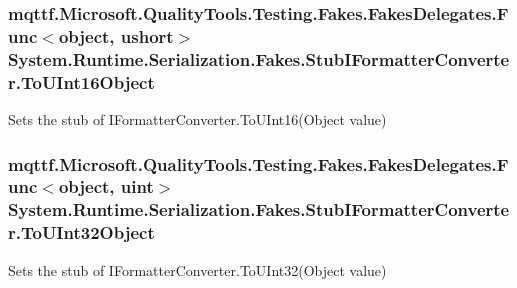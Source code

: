\hypertarget{class_system_1_1_runtime_1_1_serialization_1_1_fakes_1_1_stub_i_formatter_converter_a2c77ff194bd33699e51330b41dd48764}{
\subsubsection[{To\-U\-Int16\-Object}]{\setlength{\rightskip}{0pt plus 5cm}mqttf.\-Microsoft.\-Quality\-Tools.\-Testing.\-Fakes.\-Fakes\-Delegates.\-Func$<$object, ushort$>$ System.\-Runtime.\-Serialization.\-Fakes.\-Stub\-I\-Formatter\-Converter.\-To\-U\-Int16\-Object}}\label{class_system_1_1_runtime_1_1_serialization_1_1_fakes_1_1_stub_i_formatter_converter_a2c77ff194bd33699e51330b41dd48764}


Sets the stub of I\-Formatter\-Converter.\-To\-U\-Int16(\-Object value)

\hypertarget{class_system_1_1_runtime_1_1_serialization_1_1_fakes_1_1_stub_i_formatter_converter_a862b0e6a894ec37501e6e0def5b2529c}{
\subsubsection[{To\-U\-Int32\-Object}]{\setlength{\rightskip}{0pt plus 5cm}mqttf.\-Microsoft.\-Quality\-Tools.\-Testing.\-Fakes.\-Fakes\-Delegates.\-Func$<$object, uint$>$ System.\-Runtime.\-Serialization.\-Fakes.\-Stub\-I\-Formatter\-Converter.\-To\-U\-Int32\-Object}}\label{class_system_1_1_runtime_1_1_serialization_1_1_fakes_1_1_stub_i_formatter_converter_a862b0e6a894ec37501e6e0def5b2529c}


Sets the stub of I\-Formatter\-Converter.\-To\-U\-Int32(\-Object value)


